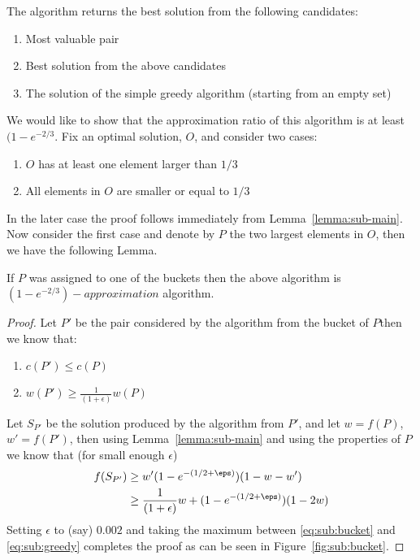 The algorithm returns the best solution from the following candidates:
\begin{enumerate}
	\item Most valuable pair
	\item Best solution from the above candidates
	\item The solution of the simple greedy algorithm (starting from an empty set)
\end{enumerate}

We would like to show that the approximation ratio of this algorithm is at least $(1 - e^{-2/3}$. 
Fix an optimal solution, $O$, and consider two cases:
\begin{enumerate}
	\item $O$ has at least one element larger than $1/3$
	\item All elements in $O$ are smaller or equal to $1/3$
\end{enumerate}
In the later case the proof follows immediately from Lemma~\ref{lemma:sub-main}.
Now consider the first case and denote by $P$ the two largest elements in $O$,
then we have the following Lemma.

\begin{lemma}
	If $P$ was assigned to one of the buckets then the above algorithm is $(1 - e^{-2/3})-approximation$ algorithm.
\end{lemma}

\begin{proof}
	Let $P'$ be the pair considered by the algorithm from the bucket of $P$then we know that:
	\begin{enumerate}
		\item $c(P') \leq c(P)$
		\item $w(P') \geq \frac{1}{(1 + \epsilon)}w(P)$
	\end{enumerate}
	Let $S_{P'}$ be the solution produced by the algorithm from $P'$, and let $w = f(P)$, $w' = f(P')$,
	then using Lemma~\ref{lemma:sub-main} and using the properties of $P$ we know that (for small enough $\epsilon$)
	\begin{align}
		\label{eq:sub:bucket}
		f(S_{P'}) & \geq w' (1-e^{-(1/2 + \eps)})(1 - w - w')
		\\ & \geq \frac{1}{(1 + \epsilon)}w + (1-e^{-(1/2 + \eps)})(1 - 2w)
	\end{align}
	Setting $\epsilon$ to (say) $0.002$ and taking the maximum between \ref{eq:sub:bucket} and
	\ref{eq:sub:greedy} completes the proof as can be seen in Figure~\ref{fig:sub:bucket}.
\end{proof}

